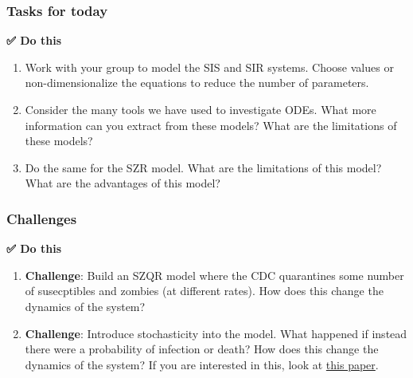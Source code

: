 \subsubsection{Tasks for today}\label{tasks-for-today}

\textbf{✅ Do this}

\begin{enumerate}
\def\labelenumi{\arabic{enumi}.}
\tightlist
\item
  Work with your group to model the SIS and SIR systems. Choose values
  or non-dimensionalize the equations to reduce the number of
  parameters.
\item
  Consider the many tools we have used to investigate ODEs. What more
  information can you extract from these models? What are the
  limitations of these models?
\item
  Do the same for the SZR model. What are the limitations of this model?
  What are the advantages of this model?
\end{enumerate}

\begin{Shaded}
\begin{Highlighting}[]
\end{Highlighting}
\end{Shaded}

\subsubsection{Challenges}\label{challenges}

\textbf{✅ Do this}

\begin{enumerate}
\def\labelenumi{\arabic{enumi}.}
\setcounter{enumi}{3}
\tightlist
\item
  \textbf{Challenge}: Build an SZQR model where the CDC quarantines some
  number of susecptibles and zombies (at different rates). How does this
  change the dynamics of the system?
\item
  \textbf{Challenge}: Introduce stochasticity into the model. What
  happened if instead there were a probability of infection or death?
  How does this change the dynamics of the system? If you are interested
  in this, look at \href{../assets/papers/z-epidemic.pdf}{this paper}.
\end{enumerate}

\begin{Shaded}
\begin{Highlighting}[]
\end{Highlighting}
\end{Shaded}

\begin{Shaded}
\begin{Highlighting}[]

\end{Highlighting}
\end{Shaded}
